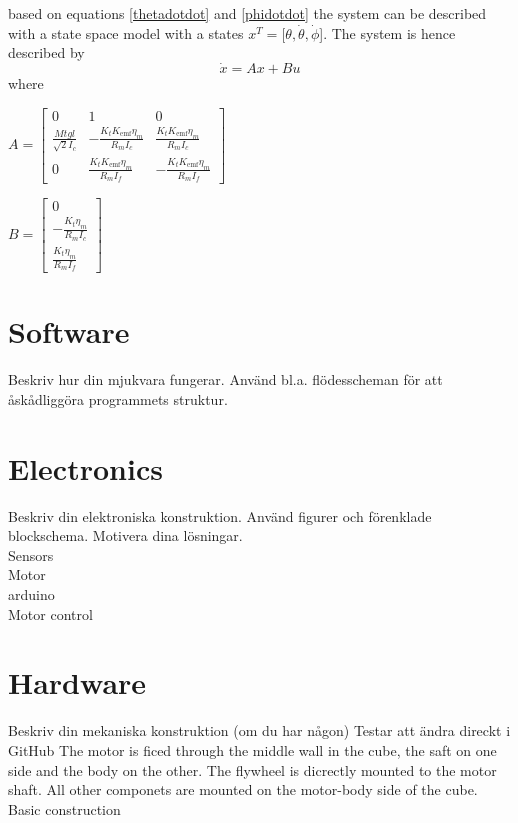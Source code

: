 \documentclass[a4paper,11pt]{kth-mag}
\begin{document}
based on equations \eqref{thetadotdot} and \eqref{phidotdot} the system can be described with a state space model with a states $x^T = [\theta, \dot{\theta}, \dot{\phi}$]. The system is hence described by
\begin{equation}
\dot{x} = Ax + Bu
\end{equation} 
where \\
\begin{center}
$A =\begin{bmatrix}
0 & 1 & 0 \\
\frac{Mt g l }{\sqrt{2} I_c} & - \frac{K_t K_{\text{emf}} \eta_m}{R_m I_c} & \frac{K_t K_{\text{emf}} \eta_m}{R_m I_c} \\ 
0 & \frac{K_t K_{\text{emf}} \eta_m}{R_m I_f} & -\frac{K_t K_{\text{emf}} \eta_m}{R_m I_f}
\end{bmatrix}$

$B = \begin{bmatrix}
0 \\ 
-\frac{K_t \eta_m}{R_m I_c} \\
\frac{K_t \eta_m}{R_m I_f}
\end{bmatrix} $
\end{center}


\section{Software}
Beskriv hur din mjukvara fungerar. Använd bl.a. flödesscheman för att åskådliggöra programmets struktur.

\section{Electronics}
Beskriv din elektroniska konstruktion. Använd figurer och förenklade blockschema. Motivera dina lösningar.
\\ Sensors
\\ Motor
\\ arduino
\\ Motor control


\section{Hardware}
Beskriv din mekaniska konstruktion (om du har någon)
Testar att ändra direckt i GitHub
The motor is ficed through the middle wall in the cube, the saft on one side and the body on the other. The flywheel is dicrectly mounted to the motor shaft. All other componets are mounted on the motor-body side of the cube.
\\ Basic construction
\end{document}
